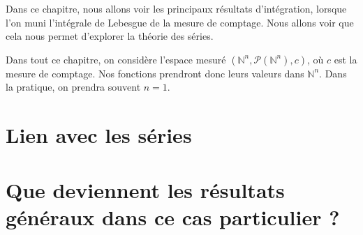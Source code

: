 \documentclass[../integ-proba.tex]{subfiles}
\begin{document}
Dans ce chapitre, nous allons voir les principaux résultats d'intégration, lorsque l'on muni l'intégrale de Lebesgue de la mesure de comptage.
Nous allons voir que cela nous permet d'explorer la théorie des séries.

Dans tout ce chapitre, on considère l'espace mesuré $\left(\mathbb{N}^n, \mathcal{P}(\mathbb{N}^n), c\right)$, où $c$ est la mesure de comptage.
Nos fonctions prendront donc leurs valeurs dans $\mathbb{N}^n$.
Dans la pratique, on prendra souvent $n=1$.

\section{Lien avec les séries}

\section{Que deviennent les résultats généraux dans ce cas particulier ?}
\end{document}
